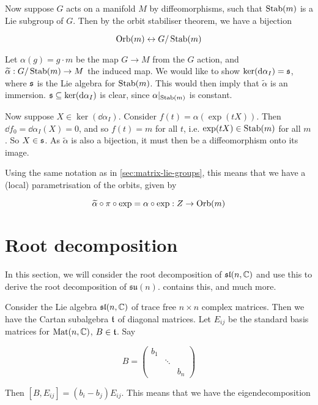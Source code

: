 \documentclass{article}
\newcommand{\su}{\mathfrak{su}}
\renewcommand{\sl}{\mathfrak{sl}}
\renewcommand{\tilde}{\widetilde}
\begin{document}
Now suppose \(G\) acts on a manifold \(M\) by diffeomorphisms, such that \(\operatorname{Stab}(m)\) is a Lie subgroup of \(G\). Then by the orbit stabiliser theorem, we have a bijection

\[\operatorname{Orb}(m) \leftrightarrow G/\operatorname{Stab}(m)\]

Let \(\alpha(g) = g \cdot m\) be the map \(G \to M\) from the \(G\) action, and \(\tilde\alpha : G/\Stab(m) \to M\) the induced map. We would like to show \(\ker(\dd\alpha_I) = \mathfrak{s}\), where \(\mathfrak{s}\) is the Lie algebra for \(\operatorname{Stab}(m)\). This would then imply that \(\tilde\alpha\) is an immersion. \(\mathfrak{s} \subseteq \ker(\dd\alpha_I)\) is clear, since \(\alpha\vert_{\operatorname{Stab}(m)}\) is constant.

Now suppose \(X \in \ker(\dd\alpha_I)\). Consider \(f(t) = \alpha(\exp(tX))\). Then \(\dd f_0 = \dd \alpha_I(X) = 0\), and so \(f(t) = m\) for all \(t\), i.e. \(\exp(tX) \in \operatorname{Stab}(m)\) for all \(m\). So \(X \in \mathfrak{s}\). As \(\tilde\alpha\) is also a bijection, it must then be a diffeomorphism onto its image.

Using the same notation as in \cref{sec:matrix-lie-groups}, this means that we have a (local) parametrisation of the orbits, given by

\begin{equation}
    \label{eq:param}
    \tilde\alpha \circ \pi \circ \exp = \alpha \circ \exp : Z \to \Orb(m)
\end{equation}

\section{Root decomposition}

\label{sec:root}

In this section, we will consider the root decomposition of \(\sl(n, \C)\) and use this to derive the root decomposition of \(\su(n)\).  \cite[\S 8]{humphreys} contains this, and much more.

Consider the Lie algebra \(\sl(n, \C)\) of trace free \(n \times n\) complex matrices. Then we have the Cartan subalgebra \(\mathfrak{t}\) of diagonal matrices. Let \(E_{ij}\) be the standard basis matrices for \(\operatorname{Mat}(n, \mathbb{C})\), \(B \in \mathfrak{t}\). Say

\[B = \begin{pmatrix}
    b_1 \\
    & \ddots \\
    & & b_n
\end{pmatrix}\]

Then \([B, E_{ij}] = (b_i - b_j)E_{ij}\). This means that we have the eigendecomposition
\end{document}
